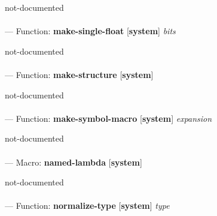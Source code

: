 \begin{adjustwidth}{5em}{5em}
not-documented
\end{adjustwidth}

\paragraph{}
\label{SYSTEM:MAKE-SINGLE-FLOAT}
--- Function: \textbf{make-single-float} [\textbf{system}] \textit{bits}

\begin{adjustwidth}{5em}{5em}
not-documented
\end{adjustwidth}

\paragraph{}
\label{SYSTEM:MAKE-STRUCTURE}
--- Function: \textbf{make-structure} [\textbf{system}] \textit{}

\begin{adjustwidth}{5em}{5em}
not-documented
\end{adjustwidth}

\paragraph{}
\label{SYSTEM:MAKE-SYMBOL-MACRO}
--- Function: \textbf{make-symbol-macro} [\textbf{system}] \textit{expansion}

\begin{adjustwidth}{5em}{5em}
not-documented
\end{adjustwidth}

\paragraph{}
\label{SYSTEM:NAMED-LAMBDA}
--- Macro: \textbf{named-lambda} [\textbf{system}] \textit{}

\begin{adjustwidth}{5em}{5em}
not-documented
\end{adjustwidth}

\paragraph{}
\label{SYSTEM:NORMALIZE-TYPE}
--- Function: \textbf{normalize-type} [\textbf{system}] \textit{type}

